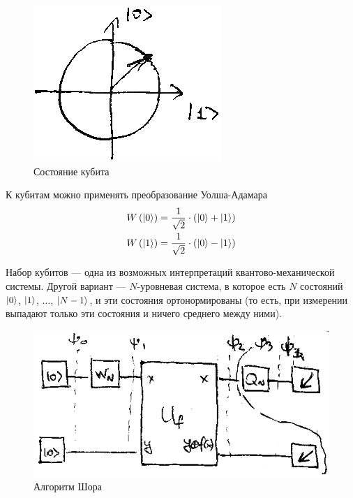 \begin{figure}[h!]
  \centering
    \includegraphics{qubit}
  \caption{Состояние кубита}
\end{figure}

К кубитам можно применять преобразование Уолша-Адамара
\begin{equation*}
  \begin{split}
    W\left( \left| 0 \right> \right)
      &= \frac{1}{\sqrt{2}} \cdot \left( \left| 0 \right> + \left| 1 \right> \right) \\
    W\left( \left| 1 \right> \right)
      &= \frac{1}{\sqrt{2}} \cdot \left( \left| 0 \right> - \left| 1 \right> \right) \\
  \end{split}
\end{equation*}

Набор кубитов --- одна из возможных интерпретаций квантово-механической системы.
Другой вариант --- $N$-уровневая система, в которое есть $N$ состояний
$\left| 0 \right>$, $\left| 1 \right>$, $\dots$, $\left| N-1 \right>$, и
эти состояния ортонормированы (то есть, при измерении выпадают только эти
состояния и ничего среднего между ними).

\begin{figure}[h!]
  \centering
    \includegraphics{shor}
  \caption{Алгоритм Шора}
  \label{fig:shor}
\end{figure}

